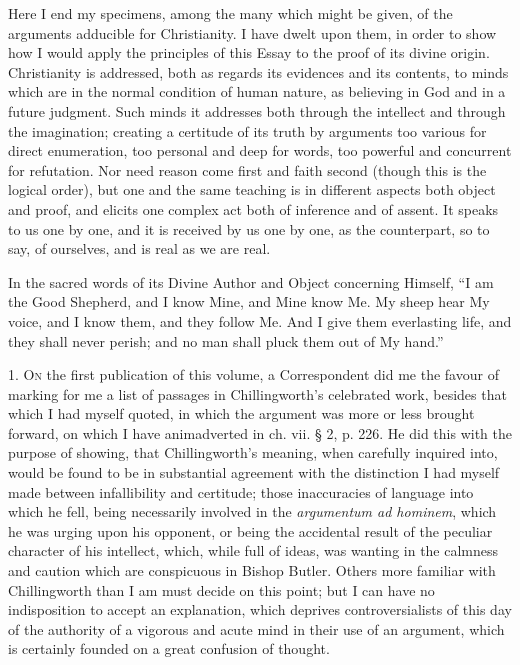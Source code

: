 Here I end my specimens, among the many which might be given, of
the arguments adducible for Christianity. I have dwelt upon them, in
order to show how I would apply the principles of this Essay to the
proof of its divine origin. Christianity is addressed, both as regards
its evidences and its contents, to minds which are in the normal
condition of human nature, as believing in God and in a future
judgment. Such minds it addresses both through the intellect and
through the imagination; creating a certitude of its truth by
arguments too various for direct enumeration, too personal and deep
for words, too powerful and concurrent for refutation. Nor need reason
come first and faith second (though this is the logical order), but
one and the same teaching is in different aspects both object and
proof, and elicits one complex act both of inference and of assent. It
speaks to us one by one, and it is received by us one by one, as the
counterpart, so to say, of ourselves, and is real as we are real.

In the sacred words of its Divine Author and Object concerning
Himself, ``I am the Good Shepherd, and I know Mine, and Mine know
Me. My sheep hear My voice, and I know them, and they follow Me. And I
give them everlasting life, and they shall never perish; and no man
shall pluck them out of My hand.''






1. O\textsc{n} the first publication of this volume, a Correspondent
did me the favour of marking for me a list of passages in
Chillingworth's celebrated work, besides that which I had myself
quoted, in which the argument was more or less brought forward, on
which I have animadverted in ch. vii. § 2, p. 226. He did this with
the purpose of showing, that Chillingworth's meaning, when carefully
inquired into, would be found to be in substantial agreement with the
distinction I had myself made between infallibility and certitude;
those inaccuracies of language into which he fell, being necessarily
involved in the \emph{argumentum ad hominem}, which he was urging upon
his opponent, or being the accidental result of the peculiar character
of his intellect, which, while full of ideas, was wanting in the
calmness and caution which are conspicuous in Bishop Butler. Others
more familiar with Chillingworth than I am must decide on this point;
but I can have no indisposition to accept an explanation, which
deprives controversialists of this day of the authority of a vigorous
and acute mind in their use of an argument, which is certainly founded
on a great confusion of thought.


